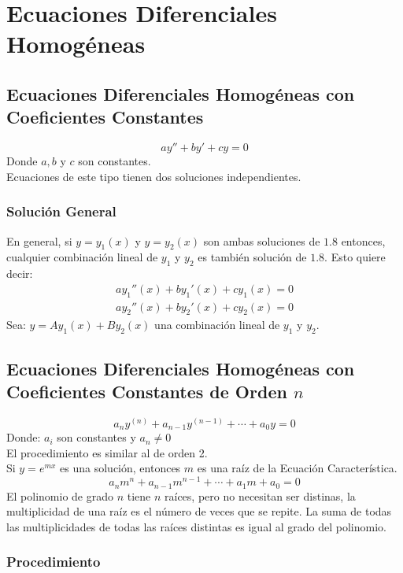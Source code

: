 \chapter{Ecuaciones Diferenciales Homogéneas}
\section{Ecuaciones Diferenciales Homogéneas con Coeficientes Constantes}
\begin{equation}
ay'' + by' +cy = 0
\end{equation}
Donde $a,b$ y $c$ son constantes. \\${ }$\\
Ecuaciones de este tipo tienen dos soluciones independientes.
\subsection{Solución General}
En general, si $y=y_1(x)$ y $y=y_2(x)$ son ambas soluciones de $1\texttt{.}8$ entonces, cualquier combinación lineal de $y_1$ y $y_2$ es también solución de $1\texttt{.}8$. Esto quiere decir:
\begin{align*}
 ay_1''(x)+by_1'(x) +cy_1(x)=0 \\
ay_2''(x)+by_2'(x) +cy_2(x)=0
\end{align*}
Sea: $y=Ay_1(x)+By_2(x)$ una combinación lineal de $y_1$ y $y_2$.
\section{Ecuaciones Diferenciales Homogéneas con Coeficientes Constantes de Orden $n$}
$$a_ny^{(n)}+a_{n-1}y^{(n-1)}+\cdots + a_0 y = 0$$
Donde: $a_i$ son constantes y $a_n\neq 0$ \\${ }$\\
El procedimiento es similar al de orden 2. \\${ }$\\
Si $y=e^{mx}$ es una solución, entonces $m$ es una raíz de la Ecuación Característica.
$$\boxed{a_nm^n+a_{n-1}m^{n-1}+\cdots +a_1 m + a_0 = 0}$$
El polinomio de grado $n$ tiene $n$ raíces, pero no necesitan ser distinas, la multiplicidad de una raíz es el número de veces que se repite. La suma de todas las multiplicidades de todas las raíces distintas es igual al grado del polinomio.
\subsection{Procedimiento}